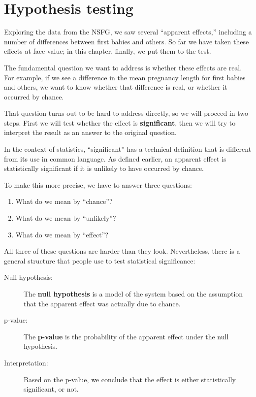 \documentclass[12pt]{book}
\begin{document}
\chapter{Hypothesis testing}
\label{testing}

Exploring the data from the NSFG, we saw several ``apparent effects,''
including a number of differences between first babies and others.
So far we have taken these effects at face value; in this chapter,
finally, we put them to the test.

The fundamental question we want to address is whether these effects
are real.  For example, if we see a difference in the mean pregnancy
length for first babies and others, we want to know whether that
difference is real, or whether it occurred by chance.

That question turns out to be hard to address directly, so we will
proceed in two steps.  First we will test whether the effect is {\bf
  significant}, then we will try to interpret the result
  as an answer to the original question.

In the context of statistics, ``significant'' has a technical
definition that is different from its use in common language.
As defined earlier, an apparent effect is statistically
significant if it is unlikely to have occurred by chance.

To make this more precise, we have to answer three questions:

\begin{enumerate}

\item What do we mean by ``chance''?

\item What do we mean by ``unlikely''?

\item What do we mean by ``effect''?

\end{enumerate}

All three of these questions are harder than they look.  Nevertheless,
there is a general structure that people use to test statistical
significance:

\begin{description}

\item[Null hypothesis:] The {\bf null hypothesis} is a model of the
  system based on the assumption that the apparent effect was actually
  due to chance.

\item[p-value:] The {\bf p-value} is the probability of the apparent
  effect under the null hypothesis.

\item[Interpretation:] Based on the p-value, we conclude that the
  effect is either statistically significant, or not.

\end{description}
\end{document}
